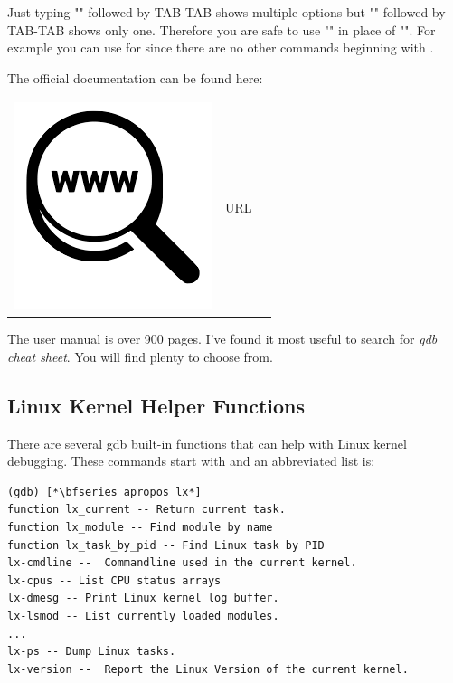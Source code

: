 \noindent
Just typing "" followed by TAB-TAB shows multiple options but "" followed by TAB-TAB shows only one. Therefore you are safe to use "" in place of "". For example you can use  for  since there are no other commands beginning with .

The official  documentation can be found here:

\begin{table}[h]
\begin{tabular}{lcl}
\parbox[r]{0.5in}{\includegraphics[scale=0.15]{figures/url.png}} & \parbox[l]{0.55in}{URL } & \parbox[l]{3in}{}
\end{tabular}
\end{table}

\noindent
The user manual is over 900 pages. I've found it most useful to search for \textit{gdb cheat sheet}. You will find plenty to choose from.


\subsection{Linux Kernel Helper Functions}\label{gdb-helper}

There are several gdb built-in functions that can help with Linux kernel debugging. These commands start with  and an abbreviated list is:

\begin{lstlisting}
(gdb) [*\bfseries apropos lx*]
function lx_current -- Return current task.
function lx_module -- Find module by name 
function lx_task_by_pid -- Find Linux task by PID 
lx-cmdline --  Commandline used in the current kernel.
lx-cpus -- List CPU status arrays
lx-dmesg -- Print Linux kernel log buffer.
lx-lsmod -- List currently loaded modules.
...
lx-ps -- Dump Linux tasks.
lx-version --  Report the Linux Version of the current kernel.
\end{lstlisting}


